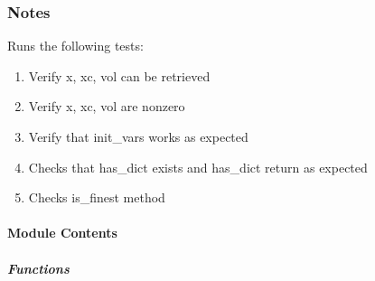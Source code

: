 \documentclass[letterpaper,10pt,english]{sphinxmanual}
\begin{document}
\subsubsection*{Notes}

\sphinxAtStartPar
Runs the following tests:
\begin{enumerate}
%
\item {} 
\sphinxAtStartPar
Verify x, xc, vol can be retrieved

\item {} 
\sphinxAtStartPar
Verify x, xc, vol are non\sphinxhyphen{}zero

\item {} 
\sphinxAtStartPar
Verify that init\_vars works as expected

\item {} 
\sphinxAtStartPar
Checks that has\_dict exists and has\_dict return as expected

\item {} 
\sphinxAtStartPar
Checks is\_finest method

\end{enumerate}


\paragraph{Module Contents}
\label{\detokenize{autoapi/tests/test_Workspace/index:module-contents}}

\subparagraph{Functions}
\label{\detokenize{autoapi/tests/test_Workspace/index:functions}}
\end{document}
